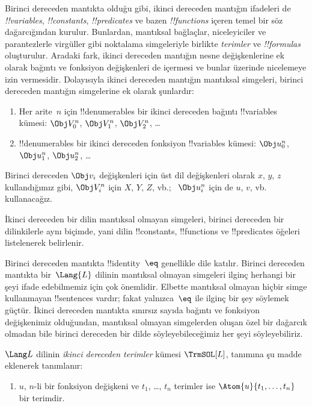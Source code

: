 \documentclass[../../../include/open-logic-section]{subfiles}
\begin{document}


Birinci dereceden mantıkta olduğu gibi, ikinci dereceden mantığın ifadeleri
de \emph{!!{variable}s}, \emph{!!{constant}s}, \emph{!!{predicate}s} ve
bazen \emph{!!{function}s} içeren temel bir söz dağarcığından kurulur.
Bunlardan, mantıksal bağlaçlar, niceleyiciler ve parantezlerle virgüller gibi
noktalama simgeleriyle birlikte \emph{terimler} ve \emph{!!{formula}s}
oluşturulur. Aradaki fark, ikinci dereceden mantığın nesne değişkenlerine ek
olarak bağıntı ve fonksiyon değişkenleri de içermesi ve bunlar üzerinde
nicelemeye izin vermesidir. Dolayısıyla ikinci dereceden mantığın mantıksal
simgeleri, birinci dereceden mantığın simgelerine ek olarak şunlardır:

\begin{enumerate}
\item Her arite~$n$ için !!{denumerable}s bir ikinci dereceden bağıntı
  !!{variable}s kümesi: $\Obj V_0^n$, $\Obj V_1^n$, $\Obj V_2^n$, \dots
\item !!{denumerable}s bir ikinci dereceden fonksiyon !!{variable}s kümesi:
  $\Obj u_0^n$, $\Obj u_1^n$, $\Obj u_2^n$, \dots
\end{enumerate}

Birinci dereceden $\Obj v_i$ değişkenleri için üst dil değişkenleri olarak
$x$, $y$, $z$ kullandığımız gibi, $\Obj V_i^n$ için $X$, $Y$, $Z$, vb.;
~$\Obj u_i^n$ için de $u$, $v$, vb. kullanacağız.

\begin{explain}
İkinci dereceden bir dilin mantıksal olmayan simgeleri, birinci dereceden
bir dilinkilerle aynı biçimde, yani dilin !!{constant}s, !!{function}s ve
!!{predicate}s öğeleri listelenerek belirlenir.

Birinci dereceden mantıkta !!{identity}~$\eq$ genellikle dile katılır.
Birinci dereceden mantıkta bir~$\Lang{L}$ dilinin mantıksal olmayan
simgeleri ilginç herhangi bir şeyi ifade edebilmemiz için çok önemlidir.
Elbette mantıksal olmayan hiçbir simge kullanmayan !!{sentence}s vardır;
fakat yalnızca~$\eq$ ile ilginç bir şey söylemek güçtür. İkinci dereceden
mantıkta sınırsız sayıda bağıntı ve fonksiyon değişkenimiz olduğundan,
mantıksal olmayan simgelerden oluşan özel bir dağarcık olmadan bile birinci
dereceden bir dilde söyleyebileceğimiz her şeyi söyleyebiliriz.
\end{explain}

\begin{defn}
$\Lang L$ dilinin \emph{ikinci dereceden terimler} kümesi $\TrmSOL[L]$,
 tanımına şu madde eklenerek tanımlanır:
\begin{enumerate}
\item $u$, $n$-li bir fonksiyon değişkeni ve $t_1$, \dots, $t_n$ terimler
  ise $\Atom{u}{t_1, \ldots, t_n}$ bir terimdir.
\end{enumerate}
\end{defn}
\end{document}

